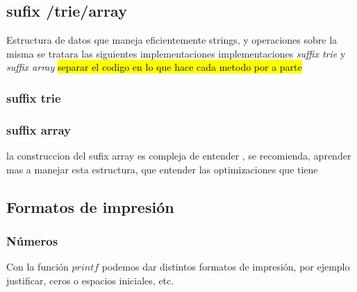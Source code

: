 \documentclass[10pt,letterpaper,twocolumn]{article}
\newcommand{\source}[1]{
  
  \dotfill
}
\begin{document}
	\subsection{sufix /trie/array}
	Estructura de datos que maneja eficientemente strings, y operaciones sobre la misma
	se tratara las siguientes implementaciones implementaciones  \textit{suffix trie} y \textit{suffix array} 
	\hl{separar el codigo en lo que hace cada metodo por a parte}\\
	
	\subsubsection{suffix trie}
	\source{./src/sufixTrie.cpp}
	
	\subsubsection{suffix array}
	la construccion del sufix array es compleja de entender , se recomienda, aprender mas a manejar esta estructura, que entender las optimizaciones que tiene 
	\source{./src/sufixArray.cpp}
		
  \subsection{Formatos de impresión}
    \subsubsection{Números}
    Con la función $printf$ podemos dar distintos formatos de impresión, por ejemplo justificar, ceros o espacios iniciales, etc.
      \source{./src/printFormat.cpp}
\end{document}
